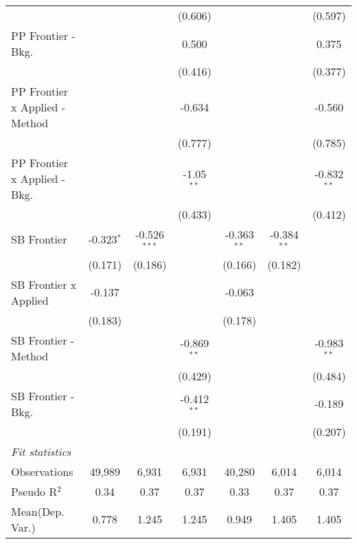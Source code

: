 \begin{tabular}{lcccccc}
                                  &                &                & (0.606)       &                &                & (0.597)\\   
   PP Frontier - Bkg.             &                &                & 0.500         &                &                & 0.375\\   
                                  &                &                & (0.416)       &                &                & (0.377)\\   
   PP Frontier x Applied - Method &                &                & -0.634        &                &                & -0.560\\   
                                  &                &                & (0.777)       &                &                & (0.785)\\   
   PP Frontier x Applied - Bkg.   &                &                & -1.05$^{**}$  &                &                & -0.832$^{**}$\\   
                                  &                &                & (0.433)       &                &                & (0.412)\\   
   SB Frontier                    & -0.323$^{*}$   & -0.526$^{***}$ &               & -0.363$^{**}$  & -0.384$^{**}$  &   \\   
                                  & (0.171)        & (0.186)        &               & (0.166)        & (0.182)        &   \\   
   SB Frontier x Applied          & -0.137         &                &               & -0.063         &                &   \\   
                                  & (0.183)        &                &               & (0.178)        &                &   \\   
   SB Frontier - Method           &                &                & -0.869$^{**}$ &                &                & -0.983$^{**}$\\   
                                  &                &                & (0.429)       &                &                & (0.484)\\   
   SB Frontier - Bkg.             &                &                & -0.412$^{**}$ &                &                & -0.189\\   
                                  &                &                & (0.191)       &                &                & (0.207)\\   
   \midrule
   \emph{Fit statistics}\\
   Observations                   & 49,989         & 6,931          & 6,931         & 40,280         & 6,014          & 6,014\\  
   Pseudo R$^2$                   & 0.34           & 0.37           & 0.37          & 0.33           & 0.37           & 0.37\\  
Mean(Dep. Var.) & 0.778 & 1.245 & 1.245 & 0.949 & 1.405 & 1.405 \\
   

\end{tabular}
